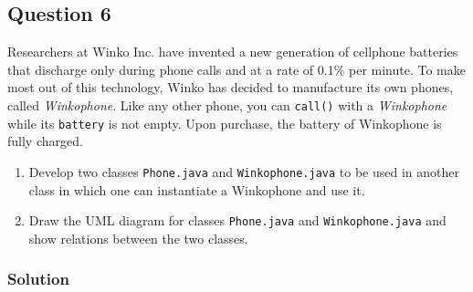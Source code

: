 \subsection*{Question 6}

Researchers at Winko Inc. have invented a new generation of cellphone batteries that discharge only during phone calls and at a rate of 0.1\% per minute. To make most out of this technology, Winko has decided to manufacture its own phones, called \textit{Winkophone}. Like any other phone, you can \texttt{call()} with a \textit{Winkophone} while its \texttt{battery} is not empty. Upon purchase, the battery of Winkophone is fully charged.

\begin{enumerate}[label=(\alph*)]
\item Develop two classes \texttt{Phone.java} and \texttt{Winkophone.java} to be used in another class in which one can instantiate a Winkophone and use it.
\item Draw the UML diagram for classes \texttt{Phone.java} and \texttt{Winkophone.java} and show relations between the two classes.
\end{enumerate}

\subsubsection*{Solution}

